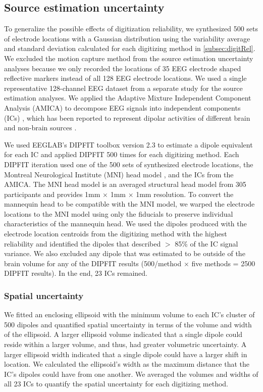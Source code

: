 \documentclass{UCF_ETD}
\renewcommand{\ul}{}
\begin{document}
\subsection{Source estimation uncertainty}
\label{subsec:soEst}
To generalize the possible effects of digitization reliability, we synthesized 500 sets of electrode locations with a Gaussian distribution using the variability average and standard deviation calculated for each digitizing method in \ref{subsec:digitRel}. We excluded the motion capture method from the source estimation uncertainty analyses because we only recorded the locations of 35 EEG electrode shaped reflective markers instead of all 128 EEG electrode locations. 
We used a single representative 128-channel EEG dataset from a separate study for the source estimation analyses. We applied the Adaptive Mixture Independent Component Analysis (AMICA) to decompose EEG signals into independent components (ICs) \citep{Palmer2007-sv}, which has been reported to represent dipolar activities of different brain and non-brain sources \citep{Delorme2012-re}. 

We used EEGLAB's DIPFIT toolbox version 2.3 to estimate a dipole equivalent for each IC and applied DIPFIT 500 times for each digitizing method. Each DIPFIT iteration used one of the 500 sets of synthesized electrode locations, the Montreal Neurological Institute (MNI) head model \citep{Evans1993-nx}, and the ICs from the AMICA. The MNI head model is an averaged structural head model from 305 participants and provides 1mm $\times$ 1mm $\times$ 1mm resolution. To convert the mannequin head to be compatible with the MNI model, we warped the electrode locations to the MNI model using only the fiducials to preserve individual characteristics of the mannequin head. We used the dipoles produced with the electrode location centroids \ul{from} the digitizing method with the highest reliability and identified the dipoles that described $>$ 85\% of the IC signal variance. We also excluded any dipole that was estimated to be outside of the brain volume for any of the DIPFIT results (500/method $\times$ five methods = 2500 DIPFIT results). In the end, 23 ICs remained.  

\subsubsection{Spatial uncertainty}
We fitted an enclosing ellipsoid with the minimum volume to each IC's cluster of 500 dipoles \citep{Moshtagh2005-em} and quantified spatial uncertainty in terms of the volume and width of the ellipsoid. A larger ellipsoid volume indicated that a single dipole could reside within a larger volume, and thus, had greater volumetric uncertainty. A larger ellipsoid width indicated that a single dipole could have a larger shift in location. We calculated the ellipsoid's width as the maximum distance that the IC's dipoles could have from one another. We averaged the volumes and widths of all 23 ICs to quantify the spatial uncertainty for each digitizing method. 
    
\end{document}
